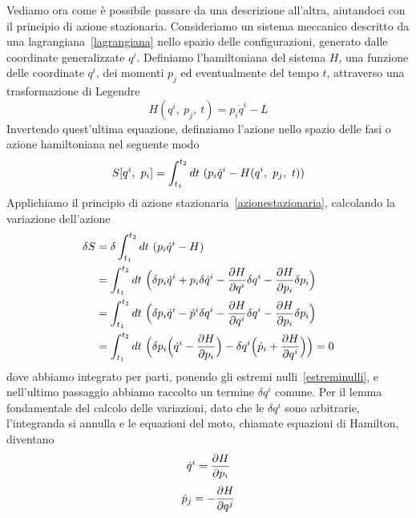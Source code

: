     Vediamo ora come è possibile passare da una descrizione all'altra, aiutandoci con il principio di azione stazionaria. Consideriamo un sistema meccanico descritto da una lagrangiana~\eqref{lagrangiana} nello spazio delle configurazioni, generato dalle coordinate generalizzate $q^i$. Definiamo l'hamiltoniana del sistema $H$, una funzione delle coordinate $q^i$, dei momenti $p_j$ ed eventualmente del tempo $t$, attraverso una trasformazione di Legendre 
    \begin{equation} \label{hamiltoniana}
        H(q^i, ~p_j, ~t) = p_i \dot q^i - L
    \end{equation} 
    Invertendo quest'ultima equazione, definziamo l'azione nello spazio delle fasi o azione hamiltoniana nel seguente modo 
    \begin{equation*}
        S[q^i, ~p_i] = \int_{t_1}^{t_2}dt~ (p_i \dot q^i - H(q^i, ~p_j, ~t))
    \end{equation*}
    Applichiamo il principio di azione stazionaria~\eqref{azionestazionaria}, calcolando la variazione dell'azione
    \begin{equation*}
    \begin{aligned}
        \delta S & = \delta \int_{t_1}^{t_2}dt~ (p_i \dot q^i - H) \\ & = \int_{t_1}^{t_2}dt~ \Big ( \delta p_i \dot q^i + p_i \delta \dot q^i - \frac{\partial H}{\partial q^i} \delta q^i - \frac{\partial H}{\partial p_i} \delta p_i \Big ) \\ & = \int_{t_1}^{t_2}dt~ \Big ( \delta p_i \dot q^i - \dot p^i \delta q^i - \frac{\partial H}{\partial q^i} \delta q^i - \frac{\partial H}{\partial p_i} \delta p_i \Big) \\ & = \int_{t_1}^{t_2}dt~ \Big ( \delta p_i \Big( \dot q^i - \frac{\partial H}{\partial p_i} \Big ) - \delta q^i \Big(\dot p_i + \frac{\partial H}{\partial q^i} \Big ) \Big) = 0
    \end{aligned}
    \end{equation*}
    dove abbiamo integrato per parti, ponendo gli estremi nulli~\eqref{estreminulli}, e nell'ultimo passaggio abbiamo raccolto un termine $\delta q^i$ comune. Per il lemma fondamentale del calcolo delle variazioni, dato che le $\delta q^i$ sono arbitrarie, l'integranda si annulla e le equazioni del moto, chiamate equazioni di Hamilton, diventano 
    \begin{equation} \label{ham1}
        \dot q^i = \frac{\partial H}{\partial p_i}
    \end{equation}
    \begin{equation} \label{ham2}
        \dot p_j = - \frac{\partial H}{\partial q^j}
    \end{equation}
    

